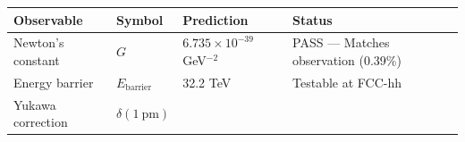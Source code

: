 \documentclass[
  11pt,
]{article}
\begin{document}
\begin{longtable}[]{@{}llll@{}}
\toprule
\begin{minipage}[b]{0.27\columnwidth}\raggedright
Observable\strut
\end{minipage} & \begin{minipage}[b]{0.18\columnwidth}\raggedright
Symbol\strut
\end{minipage} & \begin{minipage}[b]{0.27\columnwidth}\raggedright
Prediction\strut
\end{minipage} & \begin{minipage}[b]{0.18\columnwidth}\raggedright
Status\strut
\end{minipage}\tabularnewline
\midrule
\endhead
\begin{minipage}[t]{0.27\columnwidth}\raggedright
Newton's constant\strut
\end{minipage} & \begin{minipage}[t]{0.18\columnwidth}\raggedright
\(G\)\strut
\end{minipage} & \begin{minipage}[t]{0.27\columnwidth}\raggedright
\(6.735 \times 10^{-39}\) GeV\(^{-2}\)\strut
\end{minipage} & \begin{minipage}[t]{0.18\columnwidth}\raggedright
PASS --- Matches observation (0.39\%)\strut
\end{minipage}\tabularnewline
\begin{minipage}[t]{0.27\columnwidth}\raggedright
Energy barrier\strut
\end{minipage} & \begin{minipage}[t]{0.18\columnwidth}\raggedright
\(E_{\text{barrier}}\)\strut
\end{minipage} & \begin{minipage}[t]{0.27\columnwidth}\raggedright
32.2 TeV\strut
\end{minipage} & \begin{minipage}[t]{0.18\columnwidth}\raggedright
Testable at FCC-hh\strut
\end{minipage}\tabularnewline
\begin{minipage}[t]{0.27\columnwidth}\raggedright
Yukawa correction\strut
\end{minipage} & \begin{minipage}[t]{0.18\columnwidth}\raggedright
\(\delta(1~\text{pm})\)\strut
\end{minipage} & \begin{minipage}[t]{0.27\columnwidth}\raggedright

\end{minipage}
\end{longtable}
\end{document}
